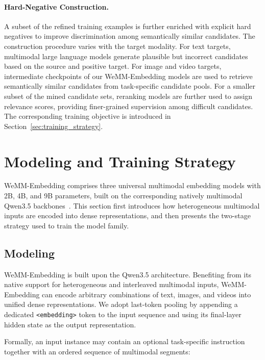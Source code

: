 \documentclass[]{wechat}
\begin{document}
\paragraph{Hard-Negative Construction.}

A subset of the refined training examples is further enriched with explicit hard negatives to improve discrimination among semantically similar candidates. The construction procedure varies with the target modality. For text targets, multimodal large language models generate plausible but incorrect candidates based on the source and positive target. For image and video targets, intermediate checkpoints of our WeMM-Embedding models are used to retrieve semantically similar candidates from task-specific candidate pools. For a smaller subset of the mined candidate sets, reranking models are further used to assign relevance scores, providing finer-grained supervision among difficult candidates. The corresponding training objective is introduced in Section~\ref{sec:training_strategy}.



\section{Modeling and Training Strategy}
\label{sec:training}

WeMM-Embedding comprises three universal multimodal embedding models with 2B, 4B, and 9B parameters, built on the corresponding natively multimodal Qwen3.5 backbones~\citep{qwen35blog}. This section first introduces how heterogeneous multimodal inputs are encoded into dense representations, and then presents the two-stage strategy used to train the model family.



\subsection{Modeling}
\label{sec:embedding_formulation}

WeMM-Embedding is built upon the Qwen3.5 architecture. Benefiting from its native support for heterogeneous and interleaved multimodal inputs, WeMM-Embedding can encode arbitrary combinations of text, images, and videos into unified dense representations. We adopt last-token pooling by appending a dedicated \texttt{<embedding>} token to the input sequence and using its final-layer hidden state as the output representation.

Formally, an input instance may contain an optional task-specific instruction together with an ordered sequence of multimodal segments:
\end{document}
